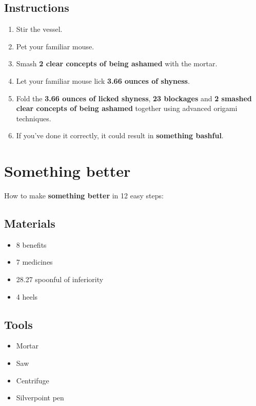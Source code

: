 \documentclass{article}
\begin{document}
\subsection{Instructions}\begin{enumerate}
\item 
Stir the vessel.
\item 
Pet your familiar mouse.
\item 
Smash \textbf{2 clear concepts of being ashamed} with the mortar.
\item 
Let your familiar mouse lick \textbf{3.66 ounces of shyness}.
\item 
Fold the \textbf{3.66 ounces of licked shyness}, \textbf{23 blockages} and \textbf{2 smashed clear concepts of being ashamed} together using advanced origami techniques.
\item 
If you've done it correctly, it could result in \textbf{something bashful}.
\end{enumerate}
\newpage
\section{Something better}How to make \textbf{something better} in 12 easy steps:

\subsection{Materials}\begin{itemize}
\item 
8 benefits
\item 
7 medicines
\item 
28.27 spoonful of inferiority
\item 
4 heels
\end{itemize}
\subsection{Tools}\begin{itemize}
\item 
Mortar
\item 
Saw
\item 
Centrifuge
\item 
Silverpoint pen
\end{itemize}
\end{document}
